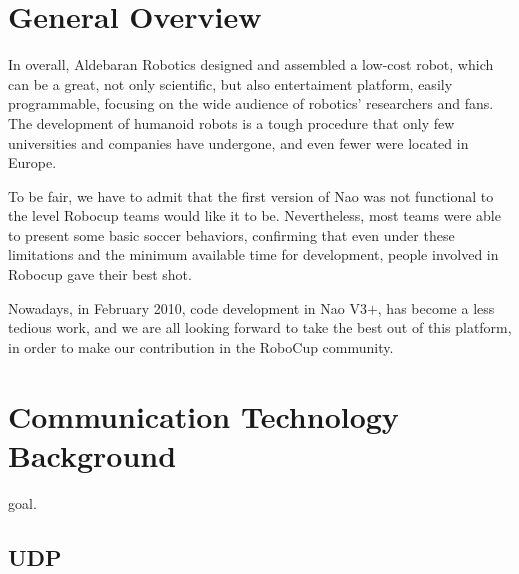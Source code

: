 \section{General Overview}

In overall, Aldebaran Robotics designed and assembled a low-cost robot, which can be a great, not only scientific, but also entertaiment platform, easily programmable, focusing on the wide audience of robotics' researchers and fans. The development of humanoid robots is a tough procedure that only few universities and companies have undergone, and even fewer were located in Europe.

To be fair, we have to admit that the first version of Nao was not functional to the level Robocup teams would like it to be. Nevertheless, most teams were able to present some basic soccer behaviors, confirming that even under these limitations and the minimum available time for development, people involved in Robocup gave their best shot.

Nowadays, in February 2010, code development in Nao V3$+$, has become a less tedious work, and we are all looking forward to take the best out of this platform, in order to make our contribution in the RoboCup community.


\section{Communication Technology Background}
\label{background}

goal.

\subsection{UDP}
\label{udp}

